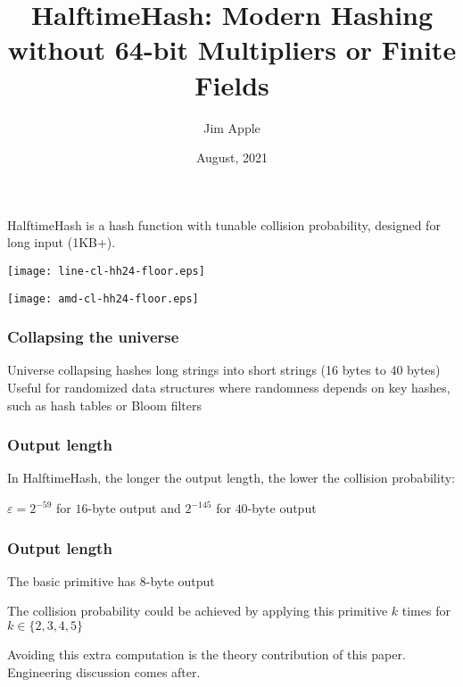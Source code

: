 \documentclass[xcolor=dvipsnames,hyperref={hidelinks}]{beamer}
\begin{document}
\title{HalftimeHash: Modern Hashing without 64-bit Multipliers or Finite Fields}
\author{Jim Apple}
\date{August, 2021}

\frame{\titlepage}

\begin{frame}
  HalftimeHash is a hash function with tunable collision probability, designed for long input (1KB+).
\end{frame}

\begin{frame}
  \begin{center}
    \texttt{[image: line-cl-hh24-floor.eps]}
  \end{center}
\end{frame}

\begin{frame}
  \begin{center}
    \texttt{[image: amd-cl-hh24-floor.eps]}
  \end{center}
\end{frame}

\begin{frame}
  \frametitle{Collapsing the universe}
  Universe collapsing hashes long strings into short strings (16 bytes to 40 bytes)
  \pause \\
  $ $ \\
  Useful for randomized data structures where randomness depends on key hashes, such as hash tables or Bloom filters
\end{frame}

\begin{frame}
  \frametitle{Output length}

  In HalftimeHash, the longer the output length, the lower the collision probability:
  \pause

$ $ \\ %
 $\varepsilon = 2^{-59}$ for $16$-byte output %
and $2^{-145}$ for $40$-byte output

\end{frame}


\begin{frame}
  \frametitle{Output length}

  The basic primitive has 8-byte output
  \pause

  $ $ \\
  The collision probability could be achieved by applying this primitive $k$ times for $k \in \{2, 3, 4, 5\}$
  \pause

  $ $ \\
  Avoiding this extra computation is the theory contribution of this paper. Engineering discussion comes after.

\end{frame}
\end{document}
